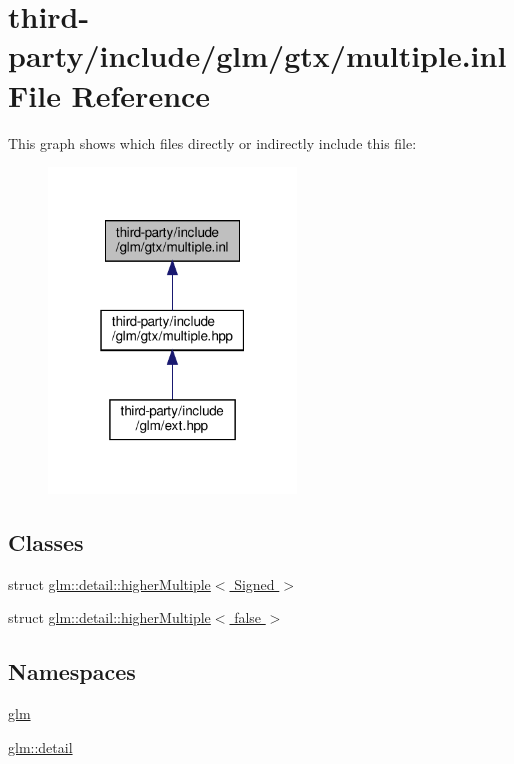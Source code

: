 \hypertarget{multiple_8inl}{}\section{third-\/party/include/glm/gtx/multiple.inl File Reference}
\label{multiple_8inl}
This graph shows which files directly or indirectly include this file\+:
\nopagebreak
\begin{figure}[H]
\begin{center}
\leavevmode
\includegraphics[width=187pt]{multiple_8inl__dep__incl}
\end{center}
\end{figure}
\subsection*{Classes}
\begin{DoxyCompactItemize}
\item 
struct \hyperlink{structglm_1_1detail_1_1higher_multiple}{glm\+::detail\+::higher\+Multiple$<$ Signed $>$}
\item 
struct \hyperlink{structglm_1_1detail_1_1higher_multiple_3_01false_01_4}{glm\+::detail\+::higher\+Multiple$<$ false $>$}
\end{DoxyCompactItemize}
\subsection*{Namespaces}
\begin{DoxyCompactItemize}
\item 
 \hyperlink{namespaceglm}{glm}
\item 
 \hyperlink{namespaceglm_1_1detail}{glm\+::detail}
\end{DoxyCompactItemize}
